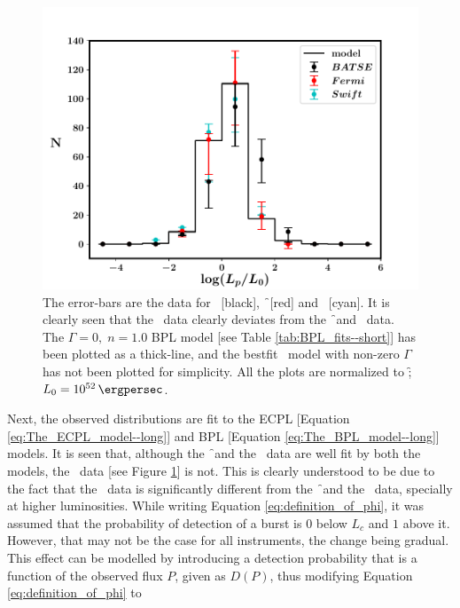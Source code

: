 \begin{figure}
\begin{center}
\includegraphics[scale=0.5]{BPL_model--joint--n=1}
\caption[Estimated luminosity distributions and model fit]{The error-bars are the data for \B\ [black], \f\ [red] and \s\ [cyan]. It is clearly seen that the \B\ data clearly deviates from the \f\ and \s\ data. The $\Gamma = 0, \; n = 1.0$ BPL model [see Table \ref{tab:BPL_fits--short}] has been plotted as a thick-line, and the bestfit \B\ model with non-zero $\Gamma$ has not been plotted for simplicity. All the plots are normalized to \f; $L_0 = 10^{52} \, \ergpersec$.}
\label{fig:data-vs-model}
\end{center}
\end{figure}


Next, the observed distributions are fit to the ECPL [Equation \ref{eq:The_ECPL_model--long}] and BPL [Equation \ref{eq:The_BPL_model--long}] models. It is seen that, although the \f\ and the \s\ data are well fit by both the models, the \B\ data [see Figure \ref{fig:data-vs-model}] is not. This is clearly understood to be due to the fact that the \B\ data is significantly different from the \f\ and the \s\ data, specially at higher luminosities. While writing Equation \ref{eq:definition_of_phi}, it was assumed that the probability of detection of a burst is $0$ below $L_c$ and $1$ above it. However, that may not be the case for all instruments, the change being gradual. This effect can be modelled by introducing a detection probability that is a function of the observed flux $P$, given as $D(P)$, thus modifying Equation \ref{eq:definition_of_phi} to

